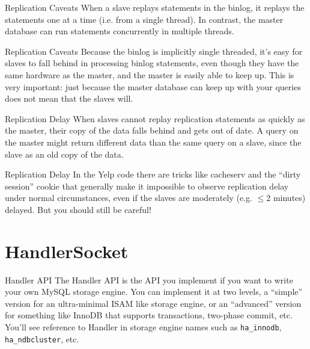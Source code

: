 \documentclass[14pt]{beamer}
\begin{document}
\begin{frame}{Replication Caveats}
  When a slave replays statements in the binlog, it replays the statements one
  at a time (i.e. from a single thread). In contrast, the master database can
  run statements concurrently in multiple threads.
\end{frame}

\begin{frame}{Replication Caveats}
  Because the binlog is implicitly single threaded, it's easy for slaves to fall
  behind in processing binlog statements, even though they have the same
  hardware as the master, and the master is easily able to keep up.
  \newline
  \newline
  This is very important: just because the master database can keep up with your
  queries does not mean that the slaves will.
\end{frame}

\begin{frame}{Replication Delay}
  When slaves cannot replay replication statements as quickly as the master,
  their copy of the data falls behind and gets out of date.
  \newline
  \newline
  A query on the master might return different data than the same query on a
  slave, since the slave as an old copy of the data.
\end{frame}

\begin{frame}{Replication Delay}
  In the Yelp code there are tricks like cacheserv and the ``dirty session''
  cookie that generally make it impossible to observe replication delay under
  normal circumstances, even if the slaves are moderately (e.g. $\le 2$ minutes)
  delayed.
  \newline
  \newline
  But you should still be careful!
\end{frame}

\section{HandlerSocket}

\begin{frame}{Handler API}
  The Handler API is the API you implement if you want to write your own MySQL
  storage engine. You can implement it at two levels, a ``simple'' version for
  an ultra-minimal ISAM like storage engine, or an ``advanced'' version for
  something like InnoDB that supports transactions, two-phase commit, etc.
  \newline
  \newline
  \pause
  You'll see reference to Handler in storage engine names such as
  \texttt{ha\_innodb}, \texttt{ha\_ndbcluster}, etc.
\end{frame}
\end{document}
